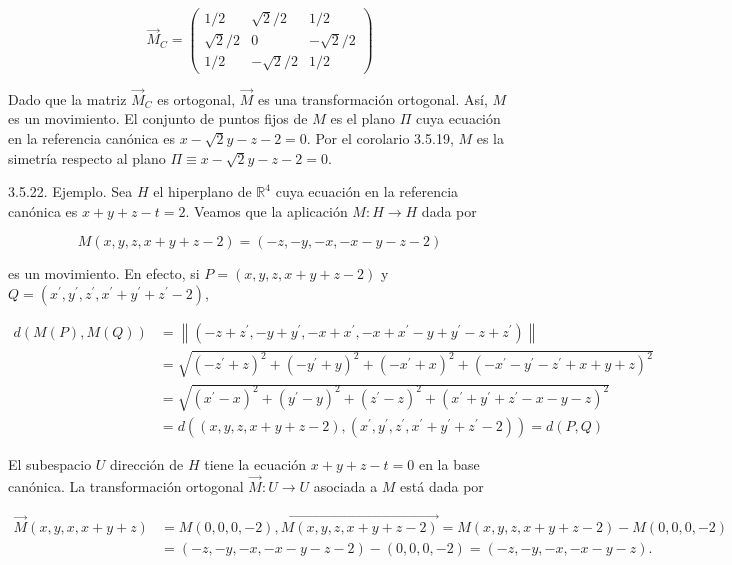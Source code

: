 \documentclass[12pt, a4paper, ones, notitlepage, openany,titlepage]{article}
\begin{document}
$$
\overrightarrow{M}_{C}=\left(\begin{array}{ccc}
	1 / 2 & \sqrt{2} / 2 & 1 / 2 \\
	\sqrt{2} / 2 & 0 & -\sqrt{2} / 2 \\
	1 / 2 & -\sqrt{2} / 2 & 1 / 2
\end{array}\right)
$$

Dado que la matriz $\overrightarrow{M}_{C}$ es ortogonal, $\overrightarrow{M}$ es una transformación ortogonal. Así, $M$ es un movimiento. El conjunto de puntos fijos de $M$ es el plano $\Pi$ cuya ecuación en la referencia canónica es $x-\sqrt{2} y-z-2=0$. Por el corolario 3.5.19, $M$ es la simetría respecto al plano $\Pi \equiv x-\sqrt{2} y-z-2=0$.

3.5.22. Ejemplo. Sea $H$ el hiperplano de $\mathbb{R}^{4}$ cuya ecuación en la referencia canónica es $x+y+z-t=2$. Veamos que la aplicación $M: H \rightarrow H$ dada por

$$
M(x, y, z, x+y+z-2)=(-z,-y,-x,-x-y-z-2)
$$

es un movimiento. En efecto, si $P=(x, y, z, x+y+z-2)$ y $Q=\left(x^{\prime}, y^{\prime}, z^{\prime}, x^{\prime}+y^{\prime}+z^{\prime}-2\right)$,

$$
\begin{aligned}
	d(M(P), M(Q)) & =\left\|\left(-z+z^{\prime},-y+y^{\prime},-x+x^{\prime},-x+x^{\prime}-y+y^{\prime}-z+z^{\prime}\right)\right\| \\
	& =\sqrt{\left(-z^{\prime}+z\right)^{2}+\left(-y^{\prime}+y\right)^{2}+\left(-x^{\prime}+x\right)^{2}+\left(-x^{\prime}-y^{\prime}-z^{\prime}+x+y+z\right)^{2}} \\
	& =\sqrt{\left(x^{\prime}-x\right)^{2}+\left(y^{\prime}-y\right)^{2}+\left(z^{\prime}-z\right)^{2}+\left(x^{\prime}+y^{\prime}+z^{\prime}-x-y-z\right)^{2}} \\
	& =d\left((x, y, z, x+y+z-2),\left(x^{\prime}, y^{\prime}, z^{\prime}, x^{\prime}+y^{\prime}+z^{\prime}-2\right)\right)=d(P, Q)
\end{aligned}
$$

El subespacio $U$ dirección de $H$ tiene la ecuación $x+y+z-t=0$ en la base canónica. La transformación ortogonal $\overrightarrow{M}: U \rightarrow U$ asociada a $M$ está dada por

$$
\begin{aligned}
	\overrightarrow{M}(x, y, x, x+y+z) & =\overrightarrow{M(0,0,0,-2), M(x, y, z, x+y+z-2)}=M(x, y, z, x+y+z-2)-M(0,0,0,-2) \\
	& =(-z,-y,-x,-x-y-z-2)-(0,0,0,-2)=(-z,-y,-x,-x-y-z) .
\end{aligned}
$$
\end{document}
